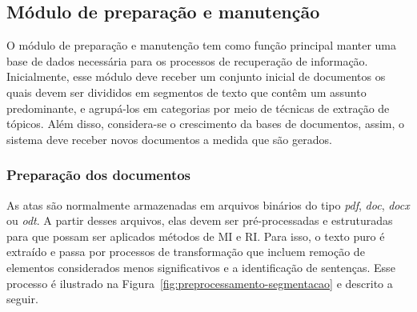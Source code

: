 \subsection{Módulo de preparação e manutenção}\label{sec:modulo-preparacao}

O módulo de preparação e manutenção tem como função principal manter uma base de dados necessária para os processos de recuperação de informação. Inicialmente, esse módulo deve receber um conjunto inicial de documentos os quais devem ser divididos em segmentos de texto que contêm um assunto predominante, e agrupá-los em categorias por meio de técnicas de extração de tópicos. Além disso, considera-se o crescimento da bases de documentos, assim, o sistema deve receber novos documentos a medida que são gerados. 







\subsubsection{Preparação dos documentos}


As atas são normalmente armazenadas em arquivos binários do tipo \textit{pdf}, \textit{doc}, \textit{docx} ou \textit{odt}. A partir desses arquivos, elas devem ser pré-processadas e estruturadas para que possam ser aplicados métodos de MI e RI. Para isso, o texto puro é extraído e passa por processos de transformação que incluem remoção de elementos considerados menos significativos e a identificação de sentenças. Esse processo é ilustrado na Figura~\ref{fig:preprocessamento-segmentacao} e descrito a seguir.

